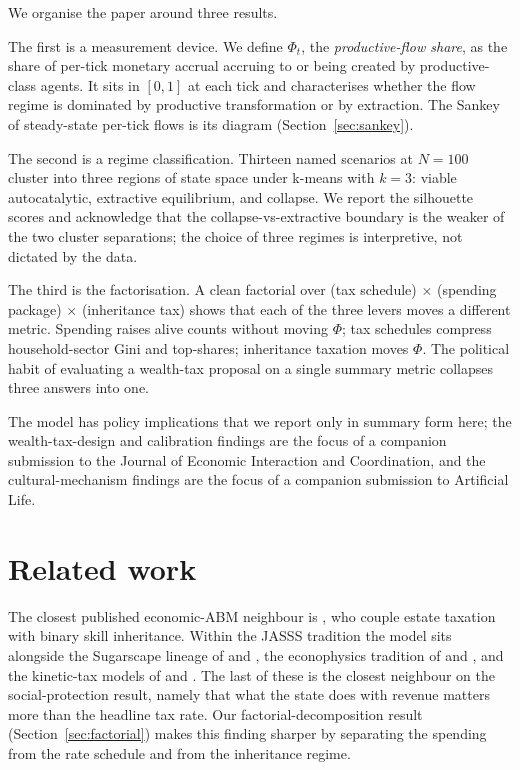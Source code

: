 \documentclass[11pt]{article}
\begin{document}
We organise the paper around three results.

The first is a measurement device.  We define $\Phi_t$, the
\emph{productive-flow share}, as the share of per-tick monetary
accrual accruing to or being created by productive-class agents.  It
sits in $[0, 1]$ at each tick and characterises whether the
flow regime is dominated by productive transformation or by
extraction.  The Sankey of steady-state per-tick flows is its
diagram (Section~\ref{sec:sankey}).

The second is a regime classification.  Thirteen named scenarios at
$N=100$ cluster into three regions of state space under k-means with
$k=3$: viable autocatalytic, extractive equilibrium, and collapse.
We report the silhouette scores and acknowledge that the
collapse-vs-extractive boundary is the weaker of the two cluster
separations; the choice of three regimes is interpretive, not
dictated by the data.

The third is the factorisation.  A clean factorial over (tax
schedule) $\times$ (spending package) $\times$ (inheritance tax)
shows that each of the three levers moves a different metric.
Spending raises alive counts without moving $\Phi$; tax schedules
compress household-sector Gini and top-shares; inheritance taxation
moves $\Phi$.  The political habit of evaluating a wealth-tax
proposal on a single summary metric collapses three answers into
one.

The model has policy implications that we report only in summary form
here; the wealth-tax-design and calibration findings are the focus of
a companion submission to the Journal of Economic Interaction and
Coordination, and the cultural-mechanism findings are the focus of a
companion submission to Artificial Life.

\section{Related work}
\label{sec:related}

The closest published economic-ABM neighbour is
\citet{spangler2022distribution}, who couple estate taxation with
binary skill inheritance.  Within the JASSS tradition the model
sits alongside the Sugarscape lineage of
\citet{epstein1996growing} and \citet{wilensky1998wealth}, the
econophysics tradition of \citet{bouchaud2000wealth} and
\citet{yakovenko2009colloquium}, and the kinetic-tax models of
\citet{bertotti2018modanese} and \citet{cardoso2025wealth}.  The
last of these is the closest neighbour on the social-protection
result, namely that what the state does with revenue matters more
than the headline tax rate.  Our factorial-decomposition result
(Section~\ref{sec:factorial}) makes this finding sharper by
separating the spending from the rate schedule and from the
inheritance regime.
\end{document}
